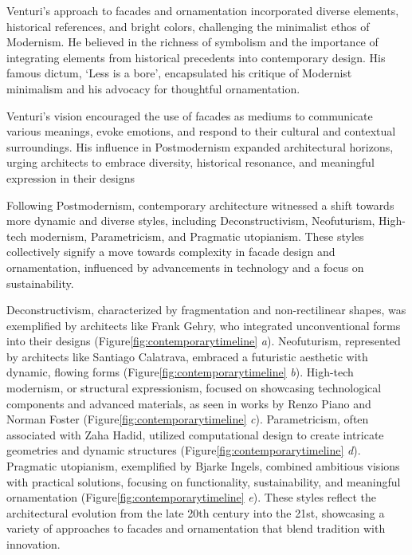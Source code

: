 Venturi's approach to facades and ornamentation incorporated diverse elements, historical references, and bright colors, challenging the minimalist ethos of Modernism.
He believed in the richness of symbolism and the importance of integrating elements from historical precedents into contemporary design\cite{Venturi1971}.
His famous dictum, `Less is a bore', encapsulated his critique of Modernist minimalism and his advocacy for thoughtful ornamentation.

Venturi's vision encouraged the use of facades as mediums to communicate various meanings, evoke emotions, and respond to their cultural and contextual surroundings.
His influence in Postmodernism expanded architectural horizons, urging architects to embrace diversity, historical resonance, and meaningful expression in their designs\cite{Lutolli2020, Stamp2016}


Following Postmodernism, contemporary architecture witnessed a shift towards more dynamic and diverse styles, including Deconstructivism, Neofuturism, High-tech modernism, Parametricism, and Pragmatic utopianism.
These styles collectively signify a move towards complexity in facade design and ornamentation, influenced by advancements in technology and a focus on sustainability.

Deconstructivism, characterized by fragmentation and non-rectilinear shapes, was exemplified by architects like Frank Gehry, who integrated unconventional forms into their designs (Figure\ref{fig:contemporarytimeline} \textit{a}).
Neofuturism, represented by architects like Santiago Calatrava, embraced a futuristic aesthetic with dynamic, flowing forms (Figure\ref{fig:contemporarytimeline} \textit{b}).
High-tech modernism, or structural expressionism, focused on showcasing technological components and advanced materials, as seen in works by Renzo Piano and Norman Foster (Figure\ref{fig:contemporarytimeline} \textit{c}).
Parametricism, often associated with Zaha Hadid, utilized computational design to create intricate geometries and dynamic structures (Figure\ref{fig:contemporarytimeline} \textit{d}).
Pragmatic utopianism, exemplified by Bjarke Ingels, combined ambitious visions with practical solutions, focusing on functionality, sustainability, and meaningful ornamentation (Figure\ref{fig:contemporarytimeline} \textit{e}).
These styles reflect the architectural evolution from the late 20th century into the 21st, showcasing a variety of approaches to facades and ornamentation that blend tradition with innovation.

